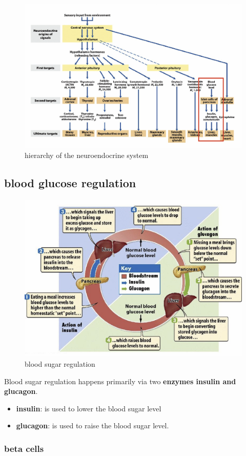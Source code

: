 \documentclass[../main.tex]{subfiles}
\begin{document}
\begin{figure}[H]
    \centering
    \includegraphics[width=0.8 \textwidth]{heirarchy.png}
    \caption{hierarchy of the neuroendocrine system}
    \label{fig:enter-label}
\end{figure}
\subsection{blood glucose regulation}
\begin{figure}[H]
    \centering
    \includegraphics[width=0.5\linewidth]{bloodSugarRegulation.png}
    \caption{blood sugar regulation}
    \label{fig:enter-label}
\end{figure}
Blood sugar regulation happens primarily via two \textbf{enzymes insulin and glucagon}. 
\begin{itemize}
    \item \textbf{insulin}: is used to lower the blood sugar level
    \item \textbf{glucagon}: is used to raise the blood sugar level.
\end{itemize}
\subsubsection{beta cells}
\end{document}
